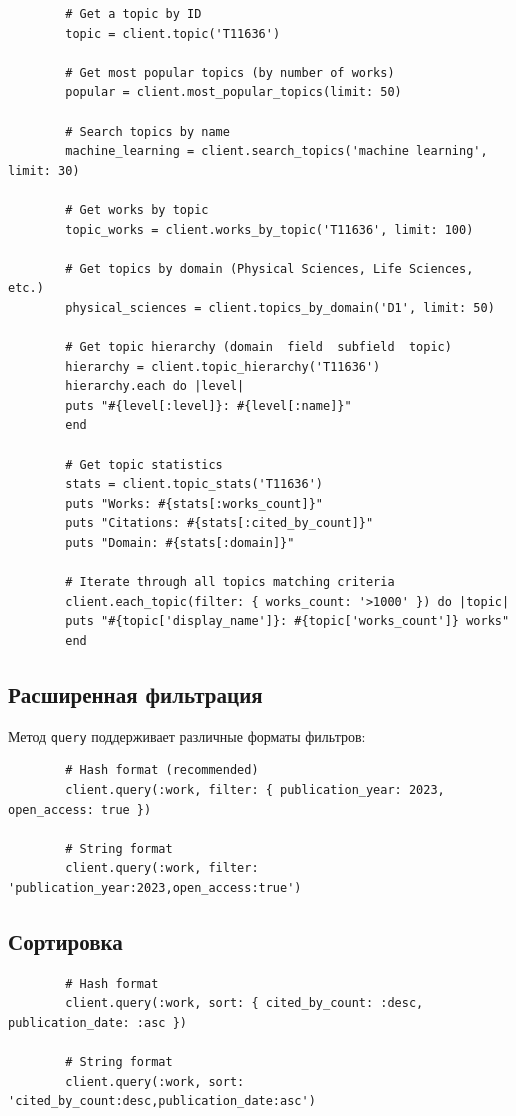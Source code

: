 \documentclass[a4paper,12pt]{article}
\begin{document}
	\begin{lstlisting}
		# Get a topic by ID
		topic = client.topic('T11636')
		
		# Get most popular topics (by number of works)
		popular = client.most_popular_topics(limit: 50)
		
		# Search topics by name
		machine_learning = client.search_topics('machine learning', limit: 30)
		
		# Get works by topic
		topic_works = client.works_by_topic('T11636', limit: 100)
		
		# Get topics by domain (Physical Sciences, Life Sciences, etc.)
		physical_sciences = client.topics_by_domain('D1', limit: 50)
		
		# Get topic hierarchy (domain  field  subfield  topic)
		hierarchy = client.topic_hierarchy('T11636')
		hierarchy.each do |level|
		puts "#{level[:level]}: #{level[:name]}"
		end
		
		# Get topic statistics
		stats = client.topic_stats('T11636')
		puts "Works: #{stats[:works_count]}"
		puts "Citations: #{stats[:cited_by_count]}"
		puts "Domain: #{stats[:domain]}"
		
		# Iterate through all topics matching criteria
		client.each_topic(filter: { works_count: '>1000' }) do |topic|
		puts "#{topic['display_name']}: #{topic['works_count']} works"
		end
	\end{lstlisting}
	
	\subsection{Расширенная фильтрация}
	
	Метод \texttt{query} поддерживает различные форматы фильтров:
	
	\begin{lstlisting}
		# Hash format (recommended)
		client.query(:work, filter: { publication_year: 2023, open_access: true })
		
		# String format
		client.query(:work, filter: 'publication_year:2023,open_access:true')
	\end{lstlisting}
	
	\subsection{Сортировка}
	
	\begin{lstlisting}
		# Hash format
		client.query(:work, sort: { cited_by_count: :desc, publication_date: :asc })
		
		# String format
		client.query(:work, sort: 'cited_by_count:desc,publication_date:asc')
	\end{lstlisting}
	
\end{document}
